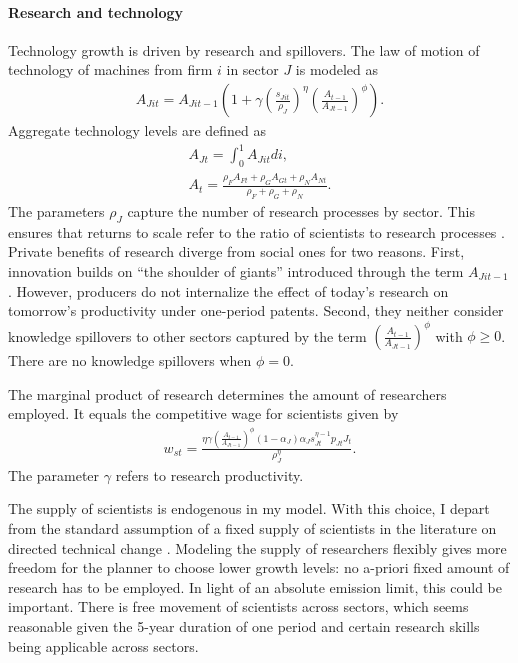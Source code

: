 \paragraph{Research and technology}
Technology growth is driven by research and spillovers. 
The law of motion of technology of machines from firm $i$ in sector $J$ is modeled as
\begin{align*}
A_{Jit}=A_{Jit-1}\left(1+\gamma\left(\frac{s_{Jit}}{\rho_J}\right)^\eta\left(\frac{A_{t-1}}{A_{Jt-1}}\right)^\phi\right).
\end{align*}
Aggregate technology levels are defined as
\begin{align*}
A_{Jt}=\int_{0}^{1}A_{Jit}di,\\
A_{t}=\frac{\rho_FA_{Ft}+\rho_GA_{Gt}+\rho_N A_{Nt}}{\rho_F+\rho_G+\rho_N}.
\end{align*}
The parameters $\rho_J$ capture the number of research processes by sector. This ensures that returns to scale refer to the ratio of scientists to research processes \citep{Fried2018ClimateAnalysis}. 
Private benefits of research diverge from social ones for two reasons. First, innovation builds on ``the shoulder of giants'' introduced through the term $A_{Jit-1}$. However, producers do not internalize the effect of today's research on tomorrow's productivity under one-period patents.  Second, they neither consider knowledge spillovers to other sectors captured by the term $\left(\frac{A_{t-1}}{A_{Jt-1}}\right)^\phi$ with $\phi\geq0$. There are no knowledge spillovers when $\phi=0$.

The marginal product of research determines the amount of researchers employed. It equals the competitive wage for scientists given by
\begin{align*}
w_{st}= \frac{\eta \gamma \left(\frac{A_{t-1}}{A_{Jt-1}}\right)^\phi (1-\alpha_J)\alpha_Js_{Jt}^{\eta-1}p_{Jt}J_t}{\rho_J^\eta}.
\end{align*}
The parameter $\gamma$ refers to research productivity.

The supply of scientists is endogenous in my model. With this choice, I depart from the standard assumption of a fixed supply of scientists in the literature on directed technical change \citep{Acemoglu2012TheChange, Fried2018ClimateAnalysis}.  Modeling the supply of researchers flexibly gives more freedom for the planner to choose lower growth levels: no a-priori fixed amount of research has to be employed. In light of an absolute emission limit, this could be important.
There is free movement of scientists across sectors, which seems reasonable given the 5-year duration of one period and certain research skills being applicable across sectors. %


